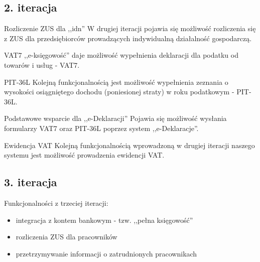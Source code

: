 \documentclass{beamer}
\begin{document}
\subsection{2. iteracja}
  \begin{frame}
    \begin{block}{Rozliczenie ZUS dla ,,idn''}
      W drugiej iteracji pojawia się możliwość rozliczenia się z ZUS dla przedsiębiorców prowadzących indywidualną działalność gospodarczą.
    \end{block}
  \end{frame}
  \begin{frame}
    \begin{block}{VAT7}
      ,,e-księgowość'' daje możliwość wypełnienia deklaracji dla podatku od towarów i usług - VAT7.
    \end{block}
  \end{frame}
  \begin{frame}
    \begin{block}{PIT-36L}
      Kolejną funkcjonalnością jest możliwość wypełnienia zeznania o wysokości osiągniętego dochodu (poniesionej straty) w roku podatkowym - PIT-36L.
    \end{block}
  \end{frame}
  \begin{frame}
    \begin{block}{Podstawowe wsparcie dla ,,e-Deklaracji''}
      Pojawia się możliwość wysłania formularzy VAT7 oraz PIT-36L poprzez system ,,e-Deklaracje''.
    \end{block}
  \end{frame}
  \begin{frame}
    \begin{block}{Ewidencja VAT}
      Kolejną funkcjonalnością wprowadzoną w drugiej iteracji naszego systemu jest możliwość prowadzenia ewidencji VAT.
    \end{block}
  \end{frame}
\subsection{3. iteracja}
  \begin{frame}
      Funkcjonalności z trzeciej iteracji:
    \begin{itemize}
      \item integracja z kontem bankowym - tzw. ,,pełna księgowość'' 
      \item rozliczenia ZUS dla pracowników
      \item przetrzymywanie informacji o zatrudnionych pracownikach
    \end{itemize}
  \end{frame}
\end{document}
